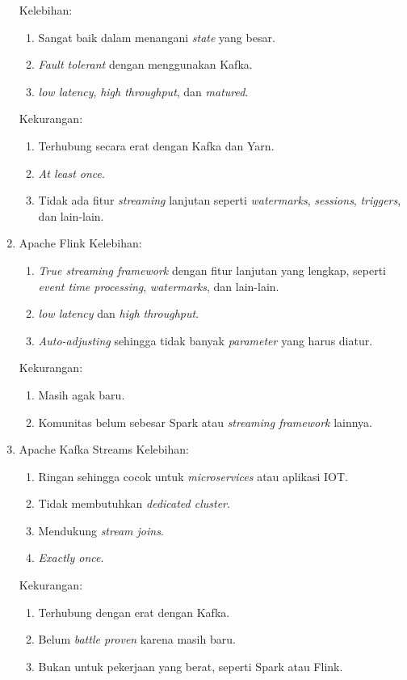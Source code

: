 \begin{enumerate}
          Kelebihan:
          \begin{enumerate}
              \item Sangat baik dalam menangani \textit{state} yang besar.
              \item \textit{Fault tolerant} dengan menggunakan Kafka.
              \item \textit{low latency}, \textit{high throughput}, dan \textit{matured}.
          \end{enumerate}
          Kekurangan:
          \begin{enumerate}
              \item Terhubung secara erat dengan Kafka dan Yarn.
              \item \textit{At least once}.
              \item Tidak ada fitur \textit{streaming} lanjutan seperti \textit{watermarks}, \textit{sessions}, \textit{triggers}, dan lain-lain.
          \end{enumerate}
    \item Apache Flink
          Kelebihan:
          \begin{enumerate}
              \item \textit{True streaming framework} dengan fitur lanjutan yang lengkap, seperti \textit{event time processing}, \textit{watermarks}, dan lain-lain.
              \item \textit{low latency} dan \textit{high throughput}.
              \item \textit{Auto-adjusting} sehingga tidak banyak \textit{parameter} yang harus diatur.
          \end{enumerate}
          Kekurangan:
          \begin{enumerate}
              \item Masih agak baru.
              \item Komunitas belum sebesar Spark atau \textit{streaming framework} lainnya.
          \end{enumerate}
    \item Apache Kafka Streams
          Kelebihan:
          \begin{enumerate}
              \item Ringan sehingga cocok untuk \textit{microservices} atau aplikasi IOT.
              \item Tidak membutuhkan \textit{dedicated cluster}.
              \item Mendukung \textit{stream joins}.
              \item \textit{Exactly once}.
          \end{enumerate}
          Kekurangan:
          \begin{enumerate}
              \item Terhubung dengan erat dengan Kafka.
              \item Belum \textit{battle proven} karena masih baru.
              \item Bukan untuk pekerjaan yang berat, seperti Spark atau Flink.
          \end{enumerate}
\end{enumerate}

